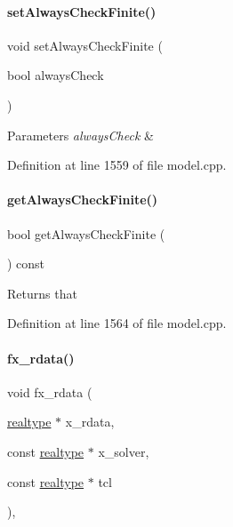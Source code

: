\paragraph{\texorpdfstring{setAlwaysCheckFinite()}{setAlwaysCheckFinite()}}
{\footnotesize\ttfamily void set\+Always\+Check\+Finite (\begin{DoxyParamCaption}\item[{bool}]{always\+Check }\end{DoxyParamCaption})}


\begin{DoxyParams}{Parameters}
{\em always\+Check} & \\
\hline
\end{DoxyParams}


Definition at line 1559 of file model.\+cpp.

\mbox{\label{classamici_1_1_model_a1e6f9f243cc9ebbc5eb759b7fc949e88}} 
\paragraph{\texorpdfstring{getAlwaysCheckFinite()}{getAlwaysCheckFinite()}}
{\footnotesize\ttfamily bool get\+Always\+Check\+Finite (\begin{DoxyParamCaption}{ }\end{DoxyParamCaption}) const}

\begin{DoxyReturn}{Returns}
that 
\end{DoxyReturn}


Definition at line 1564 of file model.\+cpp.

\mbox{\label{classamici_1_1_model_acd7cb8852c42c31704a5bd8a3410d1d9}} 
\paragraph{\texorpdfstring{fx\_rdata()}{fx\_rdata()}\hspace{0.1cm}{\footnotesize\ttfamily [2/2]}}
{\footnotesize\ttfamily void fx\+\_\+rdata (\begin{DoxyParamCaption}\item[{\mbox{\hyperlink{namespaceamici_a1bdce28051d6a53868f7ccbf5f2c14a3}{realtype}} $\ast$}]{x\+\_\+rdata,  }\item[{const \mbox{\hyperlink{namespaceamici_a1bdce28051d6a53868f7ccbf5f2c14a3}{realtype}} $\ast$}]{x\+\_\+solver,  }\item[{const \mbox{\hyperlink{namespaceamici_a1bdce28051d6a53868f7ccbf5f2c14a3}{realtype}} $\ast$}]{tcl }\end{DoxyParamCaption})\hspace{0.3cm}{\ttfamily [protected]}, {\ttfamily [virtual]}}

